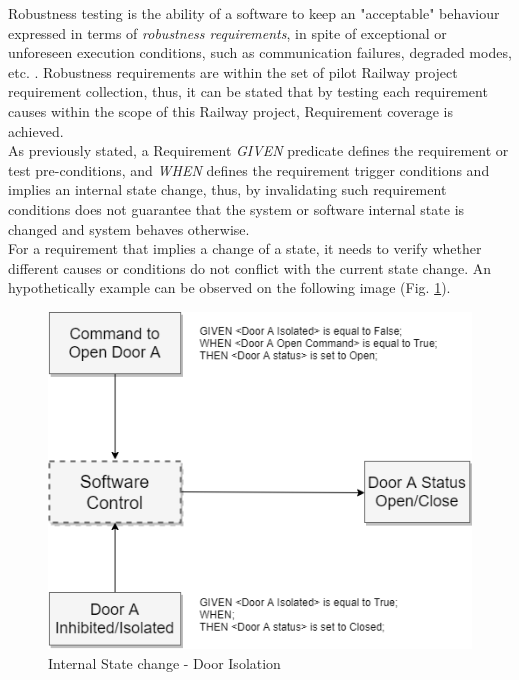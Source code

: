Robustness testing is the ability of a software to keep an "acceptable" behaviour expressed in terms of \textit{robustness requirements}, in spite of exceptional or unforeseen execution conditions, such as communication failures, degraded modes, etc. \cite{khendek_model-based_2005}. Robustness requirements are within the set of pilot Railway project requirement collection, thus, it can be stated that by testing each requirement causes within the scope of this Railway project, Requirement coverage is achieved.\\

As previously stated, a Requirement \textit{GIVEN} predicate defines the requirement or test pre-conditions, and \textit{WHEN} defines the requirement trigger conditions and implies an internal state change, thus, by invalidating such requirement conditions does not guarantee that the system or software internal state is changed and system behaves otherwise.\\

For a requirement that implies a change of a state, it needs to verify whether different causes or conditions do not conflict with the current state change. An hypothetically example can be observed on the following image (Fig. \ref{fig:door_isolation}).\\

\begin{figure}[H]
    \centering
    \includegraphics[scale=0.6]{images/isolation_diagram.png}
    \caption{Internal State change - Door Isolation}
    \label{fig:door_isolation}
\end{figure}

